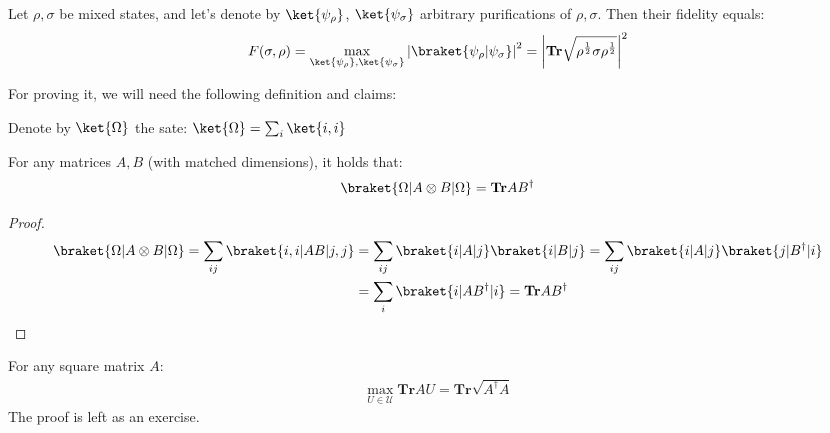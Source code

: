 \documentclass[12pt,a4paper]{article}
\begin{document}
\begin{theorem}
Let $\rho, \sigma$ be mixed states, and let's denote by $\ket{\psi_\rho}$, $\ket{\psi_\sigma}$ arbitrary purifications of $\rho, \sigma$. Then their fidelity equals:
  \begin{equation*}
    \begin{split}
      F(\sigma,\rho) = \max_{\ket{\psi_\rho}, \ket{\psi_\sigma}} \left| \braket{\psi_\rho|\psi_\sigma} \right|^2 =  \left|   \mathbf{Tr} \sqrt{      \rho^{\frac{1}{2}} \sigma \rho^{\frac{1}{2}}   }   \right|^{2}
    \end{split}
  \end{equation*}
\end{theorem}

For proving it, we will need the following definition and claims:
\begin{definition}
  Denote by $\ket{\Omega}$ the sate:  $\ket{\Omega}= \sum_{i}{\ket{i,i}}$
\end{definition}

\begin{claim} 
  \label{claim:Omg}
  For any matrices $A, B$ (with matched dimensions), it holds that:
  \begin{equation*}
    \begin{split}
    \braket{\Omega| A \otimes B  | \Omega} = \mathbf{Tr} AB^\dagger
    \end{split}
  \end{equation*}
\end{claim}
\begin{proof}
  \begin{equation*}
    \begin{split}
    \braket{\Omega| A \otimes B  | \Omega} = \sum_{ij}{ \braket{ i,i | AB | j ,j } } &=  \sum_{ij}{ \braket{ i| A | j} \braket{i | B | j } } =  \sum_{ij}{ \braket{ i| A | j} \braket{j | B^\dagger | i } } \\ 
      & = \sum_{i}{ \braket{i | A B^\dagger | i } } = \mathbf{Tr} AB^\dagger
    \end{split}
  \end{equation*}
\end{proof}

\begin{claim} For any square matrix $A$:
  \label{claim:AB}
  \begin{equation*}
    \begin{split}
      \max_{U \in \mathcal{U}} \mathbf{Tr} AU = \mathbf{Tr} \sqrt{ A^\dagger A } 
    \end{split}
  \end{equation*}
The proof is left as an exercise.
\end{claim}
\end{document}
